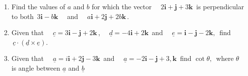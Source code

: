 \documentclass[11pt,a4paper]{article}
\theoremstyle{definition}
\begin{document}
\begin{enumerate}
\begin{enumerate}
      \item Find the values of $a$ and $b$ for which the vector $\quad  2\textbf{i} + \textbf{j} + 3\textbf{k}\,$ is perpendicular to both $\, 3\textbf{i}- b\textbf{k}\quad $ and $\quad   a\textbf{i} + 2 \textbf{j} + 2b\textbf{k}\,$.
      
      \item Given that $\quad  \underline{c} = 3\textbf{i} - \textbf{j} + 2\textbf{k}\,$, $\quad  \underline{d} = -4\textbf{i} + 2\textbf{k}\,$ and $\quad  \underline{e} = \textbf{i} - \textbf{j} - 2\textbf{k},\,$ find $\,\underline{c}\cdot\left( \underline{d}\times \underline{e}\right)$.
      
      \item Given that $\quad  \underline{a} = i\textbf{i} + 2\textbf{j} - 3\textbf{k}\,$ and $\quad  \underline{a} = -2\textbf{i} - \textbf{j} + 3,\textbf{k}\,$ find $\cot \theta,\,$ where  $\theta$ is angle between $\underline{a}$ and $\underline{b}$\\\\ 
\end{enumerate}
\end{enumerate}
\end{document}
